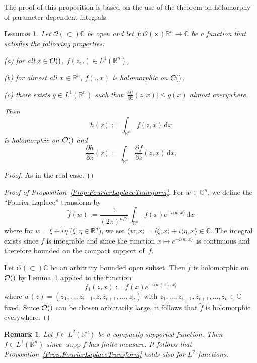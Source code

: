 \documentclass[12pt, oneside, a4paper]{article}
\newtheorem{lem}[thm]{Lemma}
\def\supp{\operatorname{supp}}
\theoremstyle{dfn}
\newtheorem{rem}[thm]{Remark}
\newcommand{\scalprod}[2]{\langle #1,#2 \rangle}
\def\Rbb{\ensuremath{\mathbb{R}}}
\def\dx{\,\mathrm dx}
\newcommand{\bigo}[1]{\mathcal{O}(#1)}
\newcommand{\Com}{\mathbb{C}}
\providecommand{\absbig}[1]{\big\lvert#1\big\rvert}
\begin{document}
The proof of this proposition is based on the use of the theorem on holomorphy of parameter-dependent integrals:

\begin{lem}\label{Lemma:HolomorphyParDepIntegrals}
Let $\bigo \subset \Com$ be open and let $f\colon \bigo \times \Rbb^n \to \Com$ be a function that satisfies the following properties:

(a) for all $z \in \bigo$, $f(z,.) \in L^1(\Rbb^n)$,

(b) for almost all $x \in \Rbb^n$, $f(.,x)$ is holomorphic on $\bigo$,

(c) there exists $g \in L^1(\Rbb^n)$ such that $\absbig{\frac{\partial f}{\partial z} (z,x)} \leqslant g(x)$ almost everywhere.

\noindent Then
\[
h(z) := \int_{\Rbb^n} f(z,x) \dx
\]
is holomorphic on $\bigo$ and
\[
\frac{\partial h}{\partial z}(z) = \int_{\Rbb^n} \frac{\partial f}{\partial z} (z,x) \dx.
\]
\end{lem}

\begin{proof}
As in the real case.
\end{proof}

\begin{proof}[Proof of Proposition~\ref{Prop:FourierLaplaceTransform}]
For $w \in \Com^n$, we define the ``Fourier-Laplace'' transform by
\[
\widetilde{f}(w) := \frac{1}{(2\pi)^{n/2}} \int_{\Rbb^n} f(x) e^{-i\scalprod{w}{x}} \dx
\]
where for $w = \xi + i \eta$ ($\xi, \eta \in \Rbb^n$), we set $\scalprod{w}{x} = \scalprod{\xi}{x} + i\scalprod{\eta}{x} \in \Com$. The integral exists since $f$ is integrable and since the function $x \mapsto e^{-i\scalprod{w}{x}}$ is continuous and therefore bounded on the compact support of~$f$.

Let $\bigo \subset \Com$ be an arbitrary bounded open subset. Then $\widetilde{f}$ is holomorphic on $\bigo$ by Lemma~\ref{Lemma:HolomorphyParDepIntegrals} applied to the function
\[
f_1 (z,x) := f(x) e^{-i\scalprod{w(z)}{x}}
\]
where $w(z) = (z_1,\dots,z_{i-1},z,z_{i+1},\dots,z_n)$ with $z_1,\dots,z_{i-1},z_{i+1},\dots,z_n \in \Com$ fixed.
Since $\bigo$ can be chosen arbitrarily large, it follows that $\widetilde{f}$ is holomorphic everywhere.
\end{proof}

\begin{rem}
Let $f \in L^2(\Rbb^n)$ be a compactly supported function. Then $f \in L^1(\Rbb^n)$ since $\supp f$ has finite measure. It follows that Proposition~\ref{Prop:FourierLaplaceTransform} holds also for $L^2$ functions.
\end{rem}
\end{document}
